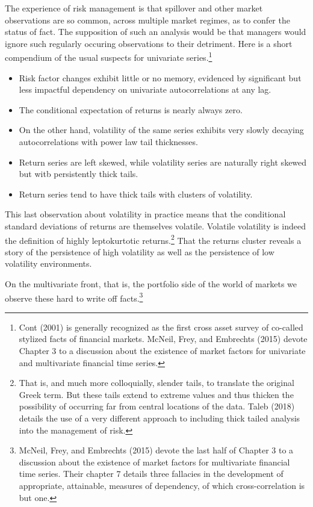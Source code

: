 \documentclass{article}
\begin{document}
The experience of risk management is that spillover and other market
observations are so common, across multiple market regimes, as to confer
the status of fact. The supposition of such an analysis would be that
managers would ignore such regularly occuring observations to their
detriment. Here is a short compendium of the usual suspects for
univariate series.\footnote{Cont (2001) is generally recognized as the
  first cross asset survey of co-called stylized facts of financial
  markets. McNeil, Frey, and Embrechts (2015) devote Chapter 3 to a
  discussion about the existence of market factors for univariate and
  multivariate financial time series.}

\begin{itemize}
\item
  Risk factor changes exhibit little or no memory, evidenced by
  significant but less impactful dependency on univariate
  autocorrelations at any lag.
\item
  The conditional expectation of returns is nearly always zero.
\item
  On the other hand, volatility of the same series exhibits very slowly
  decaying autocorrelations with power law tail thicknesses.
\item
  Return series are left skewed, while volatility series are naturally
  right skewed but witb persistently thick tails.
\item
  Return series tend to have thick tails with clusters of volatility.
\end{itemize}

This last observation about volatility in practice means that the
conditional standard deviations of returns are themselves volatile.
Volatile volatility is indeed the definition of highly leptokurtotic
returns.\footnote{That is, and much more colloquially, slender tails, to
  translate the original Greek term. But these tails extend to extreme
  values and thus thicken the possibility of occurring far from central
  locations of the data. Taleb (2018) details the use of a very
  different approach to including thick tailed analysis into the
  management of risk.} That the returns cluster reveals a story of the
persistence of high volatility as well as the persistence of low
volatility environments.

On the multivariate front, that is, the portfolio side of the world of
markets we observe these hard to write off facts.\footnote{McNeil, Frey,
  and Embrechts (2015) devote the last half of Chapter 3 to a discussion
  about the existence of market factors for multivariate financial time
  series. Their chapter 7 details three fallacies in the development of
  appropriate, attainable, measures of dependency, of which
  cross-correlation is but one.}
\end{document}
